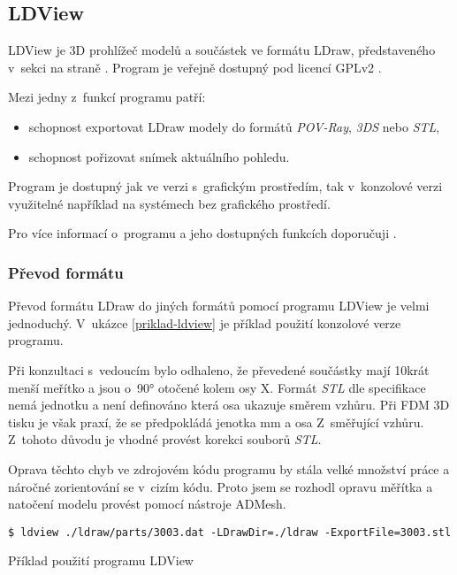 \subsection{LDView}\label{podsekce-ldview}
LDView je 3D prohlížeč modelů a součástek ve formátu LDraw, představeného v~sekci  na straně \pageref{ldraw-format}. Program je veřejně dostupný pod licencí \gls{GPLv2} \autocite{GPLv2}.

Mezi jedny z~funkcí programu patří: 
\begin{itemize}
    \item schopnost exportovat LDraw modely do formátů \textit{POV-Ray}, \textit{3DS} nebo \textit{STL},
    \item schopnost pořizovat snímek aktuálního pohledu.
\end{itemize}

Program je dostupný jak ve verzi s~grafickým prostředím, tak v~konzolové verzi využitelné například na systémech bez grafického prostředí.

Pro více informací o~programu a jeho dostupných funkcích doporučuji \autocite{ldview}.

\subsubsection*{Převod formátu}

Převod formátu LDraw do jiných formátů pomocí programu LDView je velmi jednoduchý. V~ukázce \ref{priklad-ldview} je příklad použití konzolové verze programu. 

Při konzultaci s~vedoucím bylo odhaleno, že převedené součástky mají 10krát menší meřítko a jsou o~90° otočené kolem osy X. Formát \textit{\gls{STL}} dle specifikace \autocite{stl:specification} nemá jednotku a není definováno která osa ukazuje směrem vzhůru. Při \gls{FDM} 3D tisku je však praxí, že se předpokládá jenotka mm a osa Z~směřující vzhůru. Z~tohoto důvodu je vhodné provést korekci souborů \textit{STL}.

Oprava těchto chyb ve zdrojovém kódu programu by stála velké množství práce a náročné zorientování se v~cizím kódu. Proto jsem se rozhodl opravu měřítka a natočení modelu provést pomocí nástroje ADMesh. 

 \begin{listing}[htbp]
        \begin{verbatim}
$ ldview ./ldraw/parts/3003.dat -LDrawDir=./ldraw -ExportFile=3003.stl 
        \end{verbatim}
    \caption{Příklad použití programu LDView \label{priklad-ldview}}
\end{listing}


